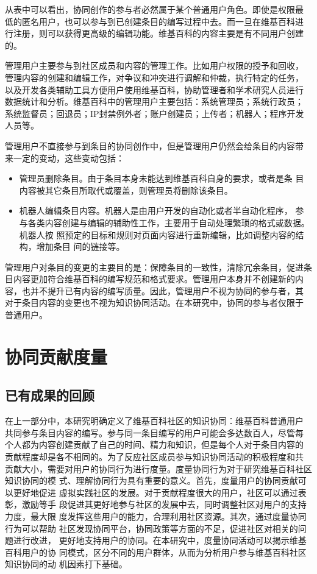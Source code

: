 
从表中可以看出，协同创作的参与者必然属于某个普通用户角色。即使是权限最
低的匿名用户，也可以参与到已创建条目的编写过程中去。而一旦在维基百科进
行注册，则可以获得更高级的编辑功能。维基百科的内容主要是有不同用户创建
的。

管理用户主要参与到社区成员和内容的管理工作。比如用户权限的授予和回收，
管理内容的创建和编辑工作，对争议和冲突进行调解和仲裁，执行特定的任务，
以及开发各类辅助工具方便用户使用维基百科，协助管理者和学术研究人员进行
数据统计和分析。维基百科中的管理用户主要包括：系统管理员；系统行政员；
系统监督员；回退员；IP封禁例外者；账户创建员；上传者；机器人；程序开发
人员等。

管理用户不直接参与到条目的协同创作中，但是管理用户仍然会给条目的内容带
来一定的变动，这些变动包括：
\begin{itemize}
\item 管理员删除条目。由于条目本身未能达到维基百科自身的要求，或者是条
  目内容被其它条目所取代或覆盖，则管理员将删除该条目。
\item 机器人编辑条目内容。机器人是由用户开发的自动化或者半自动化程序，
  参与各类内容创建与编辑的辅助性工作，主要用于自动处理繁琐的格式或数据。机器人按
照预定的目标和规则对页面内容进行重新编辑，比如调整内容的结构，增加条目
间的链接等。
\end{itemize}
管理用户对条目的变更的主要目的是：保障条目的一致性，清除冗余条目，促进条
目内容更加符合维基百科的编写规范和格式要求。管理用户本身并不创建新的内
容，也并不提升已有内容的编写质量。因此，管理用户不视为协同的参与者，其
对于条目内容的变更也不视为知识协同活动。在本研究中，协同的参与者仅限于
普通用户。

\section{协同贡献度量}

\subsection{已有成果的回顾}

在上一部分中，本研究明确定义了维基百科社区的知识协同：维基百科普通用户
共同参与条目内容的编写。参与同一条目编写的用户可能会多达数百人，尽管每
个人都为内容创建贡献了自己的时间、精力和知识，但是每个人对于条目内容的
贡献程度却是各不相同的。为了反应社区成员参与知识协同活动的积极程度和共
贡献大小，需要对用户的协同行为进行度量。度量协同行为对于研究维基百科社区知识协同的模
式、理解协同行为具有重要的意义。首先，度量用户的协同贡献可以更好地促进
虚拟实践社区的发展。对于贡献程度很大的用户，社区可以通过表彰，激励等手
段促进其更好地参与社区的发展中去，同时调整社区对用户的支持力度，最大限
度发挥这些用户的能力，合理利用社区资源。其次，通过度量协同行为可以帮助
社区发现协同平台，协同政策等方面的不足，促进社区对相关的问题进行改进，
更好地支持用户的协同。在本研究中，度量协同活动可以揭示维基百科用户的协
同模式，区分不同的用户群体，从而为分析用户参与维基百科社区知识协同的动
机因素打下基础。

